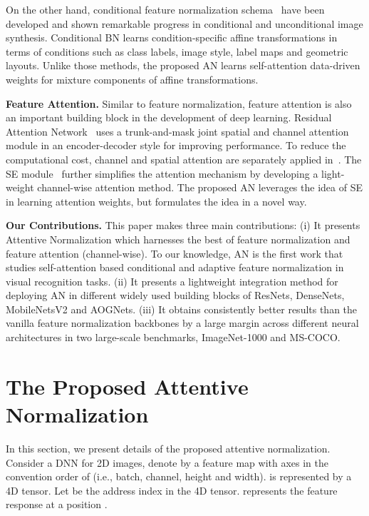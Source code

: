 \documentclass[runningheads]{llncs}
\begin{document}
On the other hand, conditional feature normalization schema~\cite{CBatchNorm1,CBatchNorm2,ConditionNorm,BigGAN,StyleGAN,SPatialAdaNorm} \cite{ISLANorm} have been developed and shown remarkable progress in conditional and unconditional image synthesis. Conditional BN learns condition-specific affine transformations in terms of conditions such as class labels,  image style, label maps and geometric layouts. Unlike those methods, the proposed AN learns self-attention data-driven weights for mixture components of affine transformations.

\textbf{Feature Attention.}
Similar to feature normalization, feature attention is also an important building block in the development of deep learning. Residual Attention Network~\cite{ResAttention} uses a trunk-and-mask joint spatial and channel attention module in an encoder-decoder style for improving performance. To reduce the computational cost, channel and spatial attention are separately applied in~\cite{CBAM}. The SE module~\cite{SENet} further simplifies the attention mechanism by developing a light-weight  channel-wise attention method. The proposed AN leverages the idea of SE in learning attention weights, but formulates the idea in a novel way.


\textbf{Our Contributions.} This paper makes three main contributions: (i) It presents Attentive Normalization which harnesses the best of feature normalization and feature attention (channel-wise). To our knowledge, AN is the first work that studies self-attention based conditional and adaptive feature normalization in visual recognition tasks.  
(ii) It presents a lightweight integration method for deploying AN in different widely used building blocks of ResNets, DenseNets, MobileNetsV2 and AOGNets. 
(iii) It obtains consistently better results than the vanilla feature normalization backbones by a large margin across different neural architectures in two large-scale benchmarks, ImageNet-1000 and MS-COCO. 




\section{The Proposed Attentive Normalization}\label{sec:AN} 
In this section, we present details of the proposed attentive normalization. 
Consider a DNN for 2D images, denote by  a feature map with axes in the convention order of  (i.e., batch, channel, height and width).  is represented by a 4D tensor. Let  be the address index in the 4D tensor.  represents the feature response at a position . 
\end{document}
